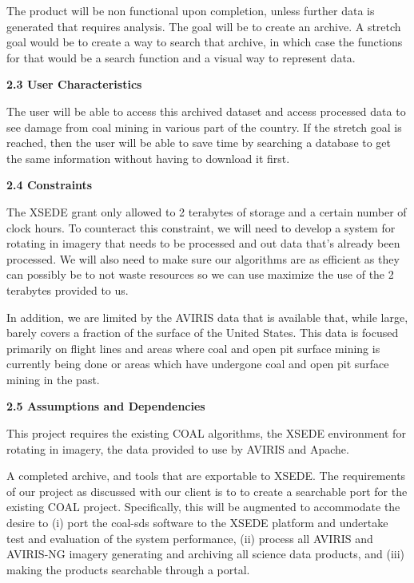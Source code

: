 \documentclass[a4paper,12pt]{article}
\begin{document}
\noindent The product will be non functional upon completion, unless further data is generated that requires analysis. The goal will be to create an archive. A stretch goal would be to create a way to search that archive, in which case the functions for that would be a search function and a visual way to represent data. \newline


\noindent \textbf{2.3 User Characteristics}\newline


\noindent The user will be able to access this archived dataset and access processed data to see damage from coal mining in various part of the country. If the stretch goal is reached, then the user will be able to save time by searching a database to get the same information without having to download it first.\newline


\noindent \textbf{2.4 Constraints}\newline


\noindent The XSEDE grant only allowed to 2 terabytes of storage and a certain number of clock hours. To counteract this constraint, we will need to develop a system for rotating in imagery that needs to be processed and out data that's already been processed. We will also need to make sure our algorithms are as efficient as they can possibly be to not waste resources so we can use maximize the use of the 2 terabytes provided to us.\newline


\noindent In addition, we are limited by the AVIRIS data that is available that, while large, barely covers a fraction of the surface of the United States. This data is focused primarily on flight lines and areas where coal and open pit surface mining is currently being done or areas which have undergone coal and open pit surface mining in the past. \newline


\noindent \textbf{2.5 Assumptions and Dependencies}\newline


\noindent This project requires the existing COAL algorithms, the XSEDE environment for rotating in imagery, the data provided to use by AVIRIS and Apache.\newline


\newline


\noindent A completed archive, and tools that are exportable to XSEDE. The requirements of our project as discussed with our client is to to create a searchable port for the existing COAL project. Specifically, this will be augmented to accommodate the desire to (i) port the coal-sds software to the XSEDE platform and undertake test and evaluation of the system performance, (ii) process all AVIRIS and AVIRIS-NG imagery generating and archiving all science data products, and (iii) making the products searchable through a portal.\newline
\end{document}
